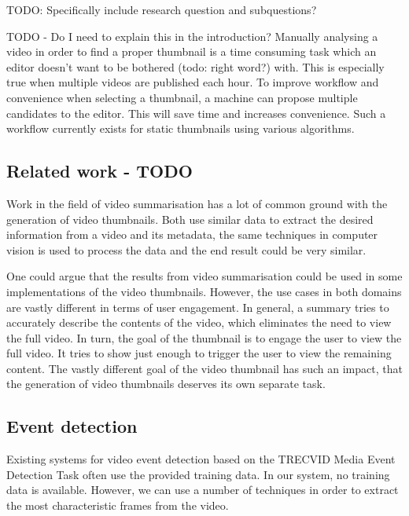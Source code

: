 \documentclass{../resources/acm_proc_article-sp}
\begin{document}
TODO: Specifically include research question and subquestions?

TODO - Do I need to explain this in the introduction?
Manually analysing a video in order to find a proper thumbnail is a time consuming task which an editor doesn't want to be bothered (todo: right word?) with. This is especially true when multiple videos are published each hour. To improve workflow and convenience when selecting a thumbnail, a machine can propose multiple candidates to the editor. This will save time and increases convenience. Such a workflow currently exists for static thumbnails using various algorithms.


\subsection{Related work - TODO}

Work in the field of video summarisation has a lot of common ground with the generation of video thumbnails. Both use similar data to extract the desired information from a video and its metadata, the same techniques in computer vision is used to process the data and the end result could be very similar. 

One could argue that the results from video summarisation could be used in some implementations of the video thumbnails. However, the use cases in both domains are vastly different in terms of user engagement. In general, a summary tries to accurately describe the contents of the video, which eliminates the need to view the full video. In turn, the goal of the thumbnail is to engage the user to view the full video. It tries to show just enough to trigger the user to view the remaining content. The vastly different goal of the video thumbnail has such an impact, that the generation of video thumbnails deserves its own separate task.


\subsection{Event detection}

Existing systems for video event detection based on the TRECVID Media Event Detection Task often use the provided training data. In our system, no training data is available. However, we can use a number of techniques in order to extract the most characteristic frames from the video.
\end{document}
